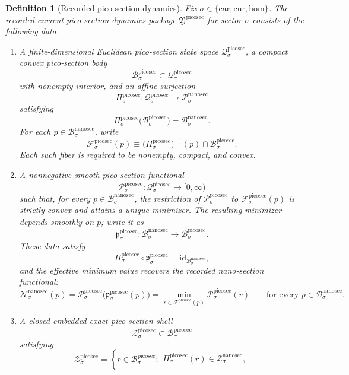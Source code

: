 \documentclass[11pt]{article}
\newcommand{\Car}{\mathrm{car}}
\newcommand{\Cur}{\mathrm{cur}}
\newcommand{\Hom}{\mathrm{hom}}
\newcommand{\NanoSectionSpace}[1]{\mathcal P_{#1}^{\mathrm{nanosec}}}
\newcommand{\NanoSectionBody}[1]{\mathcal B_{#1}^{\mathrm{nanosec}}}
\newcommand{\NanoSectionFunctional}[1]{\mathscr N_{#1}^{\mathrm{nanosec}}}
\newcommand{\NanoSectionShell}[1]{\mathcal Z_{#1}^{\mathrm{nanosec}}}
\newcommand{\PicoSectionPackage}{\mathfrak Y^{\mathrm{picosec}}}
\newcommand{\PicoSectionSpace}[1]{\mathcal Q_{#1}^{\mathrm{picosec}}}
\newcommand{\PicoSectionBody}[1]{\mathcal B_{#1}^{\mathrm{picosec}}}
\newcommand{\PicoSectionProj}[1]{\Pi_{#1}^{\mathrm{picosec}}}
\newcommand{\PicoSectionFiber}[2]{\mathcal F_{#1}^{\mathrm{picosec}}(#2)}
\newcommand{\PicoSectionNanoMin}[1]{\mathfrak p_{#1}^{\mathrm{picosec}}}
\newcommand{\PicoSectionFunctional}[1]{\mathscr P_{#1}^{\mathrm{picosec}}}
\newcommand{\PicoSectionShell}[1]{\mathcal Z_{#1}^{\mathrm{picosec}}}
\newtheorem{definition}{Definition}
\begin{document}
\begin{definition}[Recorded pico-section dynamics]
\label{def:picosec}
Fix \(\sigma\in\{\Car,\Cur,\Hom\}\). The recorded current pico-section dynamics package \(\PicoSectionPackage\) for sector \(\sigma\) consists of the following data.
\begin{enumerate}
    \item A finite-dimensional Euclidean pico-section state space \(\PicoSectionSpace{\sigma}\), a compact convex pico-section body
    \[
    \PicoSectionBody{\sigma}\subset\PicoSectionSpace{\sigma}
    \]
    with nonempty interior, and an affine surjection
    \[
    \PicoSectionProj{\sigma}:\PicoSectionSpace{\sigma}\to\NanoSectionSpace{\sigma}
    \]
    satisfying
    \[
    \PicoSectionProj{\sigma}\bigl(\PicoSectionBody{\sigma}\bigr)=\NanoSectionBody{\sigma}.
    \]
    For each \(p\in\NanoSectionBody{\sigma}\), write
    \[
    \PicoSectionFiber{\sigma}{p}
    \equiv
    \bigl(\PicoSectionProj{\sigma}\bigr)^{-1}(p)\cap\PicoSectionBody{\sigma}.
    \]
    Each such fiber is required to be nonempty, compact, and convex.
    \item A nonnegative smooth pico-section functional
    \[
    \PicoSectionFunctional{\sigma}:\PicoSectionSpace{\sigma}\to[0,\infty)
    \]
    such that, for every \(p\in\NanoSectionBody{\sigma}\), the restriction of \(\PicoSectionFunctional{\sigma}\) to \(\PicoSectionFiber{\sigma}{p}\) is strictly convex and attains a unique minimizer. The resulting minimizer depends smoothly on \(p\); write it as
    \[
    \PicoSectionNanoMin{\sigma}:\NanoSectionBody{\sigma}\to\PicoSectionBody{\sigma}.
    \]
    These data satisfy
    \[
    \PicoSectionProj{\sigma}\circ\PicoSectionNanoMin{\sigma}
    =
    \mathrm{id}_{\NanoSectionBody{\sigma}},
    \]
    and the effective minimum value recovers the recorded nano-section functional:
    \[
    \NanoSectionFunctional{\sigma}(p)
    =
    \PicoSectionFunctional{\sigma}\bigl(\PicoSectionNanoMin{\sigma}(p)\bigr)
    =
    \min_{r\in\PicoSectionFiber{\sigma}{p}}
    \PicoSectionFunctional{\sigma}(r)
    \qquad
    \text{for every }
    p\in\NanoSectionBody{\sigma}.
    \]
    \item A closed embedded exact pico-section shell
    \[
    \PicoSectionShell{\sigma}\subset\PicoSectionBody{\sigma}
    \]
    satisfying
    \[
    \PicoSectionShell{\sigma}
    =
    \left\{
    r\in\PicoSectionBody{\sigma}:
    \begin{array}{l}
    \PicoSectionProj{\sigma}(r)\in\NanoSectionShell{\sigma},\\[0.2em]

\end{array}\]
\end{enumerate}
\end{definition}
\end{document}
